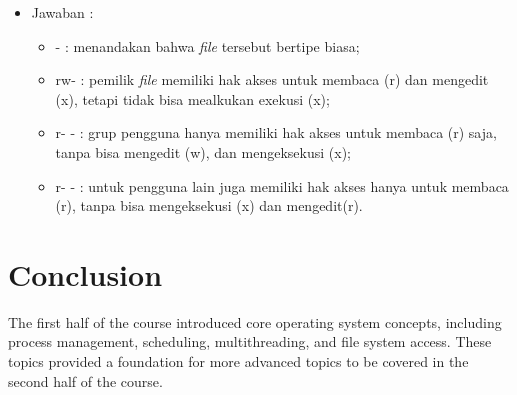 \documentclass[12pt]{article}
\begin{document}
\begin{itemize}
        \item Jawaban :
         \begin{itemize}
             \item - : menandakan bahwa \textit{file} tersebut bertipe biasa;
             \item rw- : pemilik \textit{file} memiliki hak akses untuk membaca (r) dan mengedit (x), tetapi tidak bisa mealkukan exekusi (x);
             \item r- - : grup pengguna hanya memiliki hak akses untuk membaca (r) saja, tanpa bisa mengedit (w), dan mengeksekusi (x);
             \item r- - : untuk pengguna lain juga memiliki hak akses hanya untuk membaca (r), tanpa bisa mengeksekusi (x) dan mengedit(r).
         \end{itemize}
\end{itemize}

\section{Conclusion}
The first half of the course introduced core operating system concepts, including process management, scheduling, multithreading, and file system access. These topics provided a foundation for more advanced topics to be covered in the second half of the course.
\end{document}
